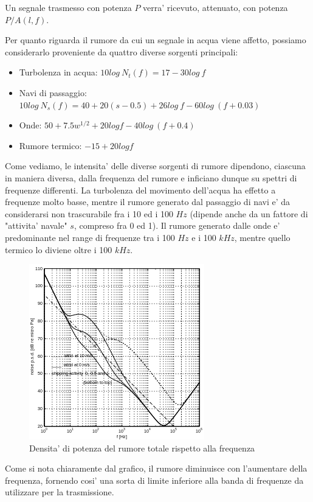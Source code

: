 \documentclass[Lau,binding=0.6cm]{sapthesis}
\begin{document}
Un segnale trasmesso con potenza $P$ verra' ricevuto, attenuato, con potenza $P/A(l, f)$.
\par
Per quanto riguarda il rumore da cui un segnale in acqua viene affetto, possiamo considerarlo proveniente da quattro diverse sorgenti principali:
\begin{itemize}
    \item Turbolenza in acqua: $10log\ N_t(f) = 17 - 30log\ f$
    \item Navi di passaggio: $10log\ N_s(f) = 40 + 20(s - 0.5) + 26log\ f - 60log\ (f+0.03)$
    \item Onde: $50 + 7.5w^{1/2}+ 20logf - 40log\ (f+0.4)$
    \item Rumore termico: $-15 + 20logf$
\end{itemize}
Come vediamo, le intensita' delle diverse sorgenti di rumore dipendono, ciascuna in maniera diversa, dalla frequenza del rumore e inficiano dunque su spettri di frequenze differenti. La turbolenza del movimento dell'acqua ha effetto a frequenze molto basse, mentre il rumore generato dal passaggio di navi e' da considerarsi non trascurabile fra i 10 ed i 100 $Hz$ (dipende anche da un fattore di "attivita' navale" $s$, compreso fra 0 ed 1). Il rumore generato dalle onde e' predominante nel range di frequenze tra i 100 $Hz$ e i 100 $kHz$, mentre quello termico lo diviene oltre i 100 $kHz$.
\begin{figure}[H]
    \centering
    \includegraphics[]{noise.png}
    \caption{Densita' di potenza del rumore totale rispetto alla frequenza}
\end{figure}
Come si nota chiaramente dal grafico, il rumore diminuisce con l'aumentare della frequenza, fornendo cosi' una sorta di limite inferiore alla banda di frequenze da utilizzare per la trasmissione.
\par
\end{document}
